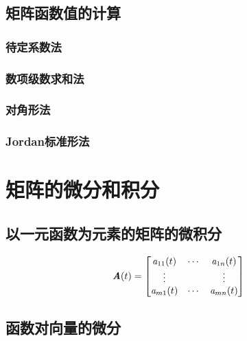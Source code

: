 \subsection{矩阵函数值的计算}
\label{sub:矩阵函数值的计算}

\subsubsection{待定系数法}
\label{ssub:待定系数法}

\subsubsection{数项级数求和法}
\label{ssub:数项级数求和法}

\subsubsection{对角形法}
\label{ssub:对角形法}

\subsubsection{Jordan标准形法}
\label{ssub:Jordan标准形法}

\begin{definition}
\end{definition}

\section{矩阵的微分和积分}
\label{sec:矩阵的微分和积分}

\subsection{以一元函数为元素的矩阵的微积分}
\label{sub:以一元函数为元素的矩阵的微积分}

\[
    \boldsymbol{\mathit{A}}(t) = \begin{bmatrix}
        \mathit{a}_{11}(t) & \cdots    & \mathit{a}_{1n}(t)   \\
        \vdots      &           & \vdots        \\
        \mathit{a}_{m1}(t) & \cdots    & \mathit{a}_{mn}(t)
    \end{bmatrix}
\]

\subsection{函数对向量的微分}
\label{sub:函数对向量的微分}

